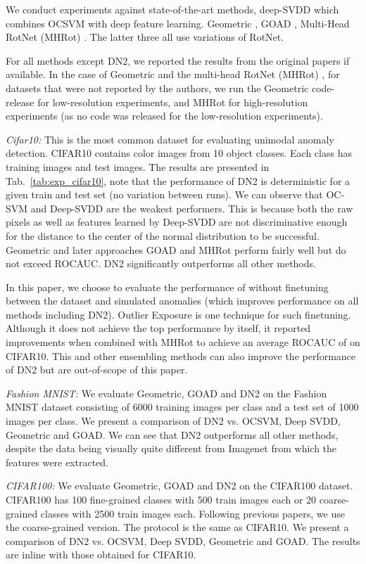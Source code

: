 \documentclass{article}
\begin{document}
We conduct experiments against state-of-the-art methods, deep-SVDD \cite{ruff2018deep} which combines OCSVM with deep feature learning. Geometric \cite{golan2018deep}, GOAD \cite{bergman2020classification}, Multi-Head RotNet (MHRot) \cite{hendrycks2019using}. The latter three all use variations of RotNet. 

For all methods except DN2, we reported the results from the original papers if available. In the case of Geometric \cite{golan2018deep} and the multi-head RotNet (MHRot) \cite{hendrycks2019using}, for datasets that were not reported by the authors, we run the Geometric code-release for low-resolution experiments, and MHRot for high-resolution experiments (as no code was released for the low-resolution experiments).   

\textit{Cifar10:} This is the most common dataset for evaluating unimodal anomaly detection. CIFAR10 contains  color images from 10 object classes. Each class has  training images and  test images. The results are presented in Tab.~\ref{tab:exp_cifar10}, note that the performance of DN2 is deterministic for a given train and test set (no variation between runs). We can observe that OC-SVM and Deep-SVDD are the weakest performers. This is because both the raw pixels as well as features learned by Deep-SVDD are not discriminative enough for the distance to the center of the normal distribution to be successful. Geometric and later approaches GOAD and MHRot perform fairly well but do not exceed  ROCAUC. DN2 significantly outperforms all other methods.

In this paper, we choose to evaluate the performance of without finetuning between the dataset and simulated anomalies (which improves performance on all methods including DN2). Outlier Exposure is one technique for such finetuning. Although it does not achieve the top performance by itself, it reported improvements when combined with MHRot to achieve an average ROCAUC of  on CIFAR10. This and other ensembling methods can also improve the performance of DN2 but are out-of-scope of this paper.    

\textit{Fashion MNIST:} We evaluate Geometric, GOAD and DN2 on the Fashion MNIST dataset consisting of 6000 training images per class and a test set of 1000 images per class.  We present a comparison of DN2 vs. OCSVM, Deep SVDD, Geometric and GOAD. We can see that DN2 outperforms all other methods, despite the data being visually quite different from Imagenet from which the features were extracted.

\textit{CIFAR100:} We evaluate Geometric, GOAD and DN2 on the CIFAR100 dataset. CIFAR100 has 100 fine-grained classes with 500 train images each or 20 coarse-grained classes with 2500 train images each. Following previous papers, we use the coarse-grained version. The protocol is the same as CIFAR10. We present a comparison of DN2 vs. OCSVM, Deep SVDD, Geometric and GOAD. The results are inline with those obtained for CIFAR10.
\end{document}
